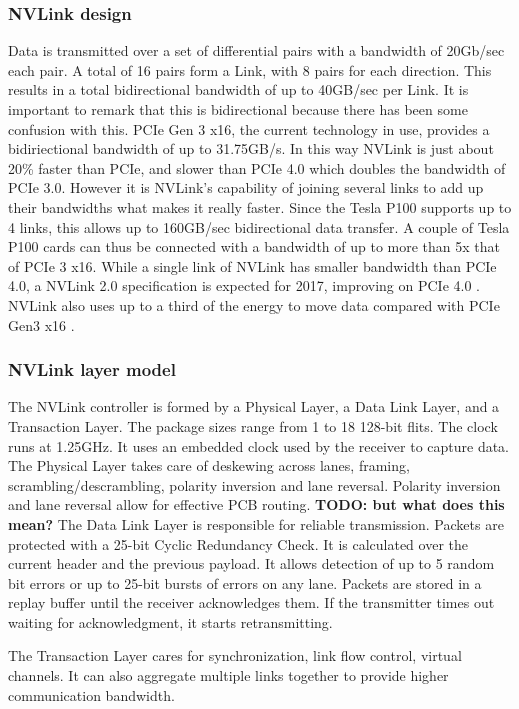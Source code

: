 \subsubsection{NVLink design}
Data is transmitted over a set of differential pairs with a bandwidth of 20Gb/sec each pair.
A total of 16 pairs form a Link, with 8 pairs for each direction.
This results in a total bidirectional bandwidth of up to 40GB/sec per Link.
It is important to remark that this is bidirectional because there has been some confusion with this.
PCIe Gen 3 x16, the current technology in use, provides a bidiriectional bandwidth of up to 31.75GB/s.
In this way NVLink is just about 20\% faster than PCIe, and slower than PCIe 4.0 which doubles the bandwidth of PCIe 3.0.
However it is NVLink's capability of joining several links to add up their bandwidths what makes it really faster.
Since the Tesla P100 supports up to 4 links, this allows up to 160GB/sec bidirectional data transfer.
A couple of Tesla P100 cards can thus be connected with a bandwidth of up to more than 5x that of PCIe 3 x16.
While a single link of NVLink has smaller bandwidth than PCIe 4.0, a NVLink 2.0 specification is expected for 2017, improving on PCIe 4.0 \cite{nextplatform:nvlink}.
NVLink also uses up to a third of the energy to move data compared with PCIe Gen3 x16 \cite{nvidia:hpcnvlink}.

\subsubsection{NVLink layer model}
The NVLink controller is formed by a Physical Layer, a Data Link Layer, and a Transaction Layer.
The package sizes range from 1 to 18 128-bit flits.
The clock runs at 1.25GHz.
It uses an embedded clock used by the receiver to capture data.
The Physical Layer takes care of deskewing across lanes, framing, scrambling/descrambling, polarity inversion and lane reversal.
Polarity inversion and lane reversal allow for effective PCB routing. \textbf{TODO: but what does this mean?}
The Data Link Layer is responsible for reliable transmission.
Packets are protected with a 25-bit Cyclic Redundancy Check.
It is calculated over the current header and the previous payload.
It allows detection of up to 5 random bit errors or up to 25-bit bursts of errors on any lane.
Packets are stored in a replay buffer until the receiver acknowledges them.
If the transmitter times out waiting for acknowledgment, it starts retransmitting.

The Transaction Layer cares for synchronization, link flow control, virtual channels.
It can also aggregate multiple links together to provide higher communication bandwidth.

